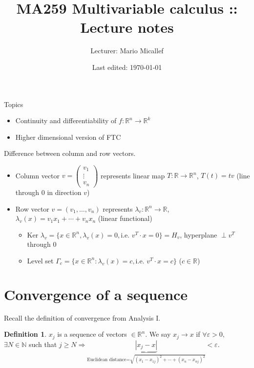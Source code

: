 \documentclass[a4paper]{article}
\title{MA259 Multivariable calculus :: Lecture notes}
\author{Lecturer: Mario Micallef}
\date{Last edited: \today}
\theoremstyle{definition}
\newtheorem{defn}{Definition}[subsection]
\begin{document}
\maketitle
\thispagestyle{empty}

\tableofcontents
\thispagestyle{empty}
\newpage
\setcounter{page}{1}

Topics
\begin{itemize}
	\item Continuity and differentiability of $f: \mathbb{R}^n \rightarrow \mathbb{R}^k$
	\item Higher dimensional version of FTC
\end{itemize}

Difference between column and row vectors.

\begin{itemize}
	\item Column vector $v=\begin{pmatrix}
		v_1 \\ \vdots \\ v_n
	\end{pmatrix}$ represents linear map $T: \mathbb{R} \rightarrow \mathbb{R}^n$, $T(t) = tv$ (line through 0 in direction $v$)
	\item Row vector $v=(v_1,\ldots,v_n)$ represents $\lambda_v:\mathbb{R}^n \rightarrow \mathbb{R}$, $\lambda_v(x)=v_1x_1+\cdots+v_nx_n$ (linear functional)
	\begin{itemize}
		\item Ker $\lambda_v = \{ x \in \mathbb{R}^n, \lambda_v(x)=0, \text{i.e. }v^T \cdot x =0 \}=H_v$, hyperplane $\perp v^T$ through 0
		\item Level set $\Gamma_c=\{ x \in \mathbb{R}^n : \lambda_v(x)=c, \text{i.e. } v^T \cdot x=c \}$ ($c\in \mathbb{R}$)
	\end{itemize} 
\end{itemize}

\section{Convergence of a sequence}
Recall the definition of convergence from Analysis I.
\begin{defn}
	$x_j$ is a sequence of vectors $\in \mathbb{R}^n$. We say $x_j \rightarrow x$ if $\forall \varepsilon > 0,$ $\exists N \in \mathbb N$ such that $j \geq N \Rightarrow \underbrace{|x_j-x|}_{\text{Euclidean distance=}\sqrt{(x_1-x_{1j})^2+\cdots +(x_n-x_{nj})^2}} < \varepsilon$.
\end{defn}
\end{document}
